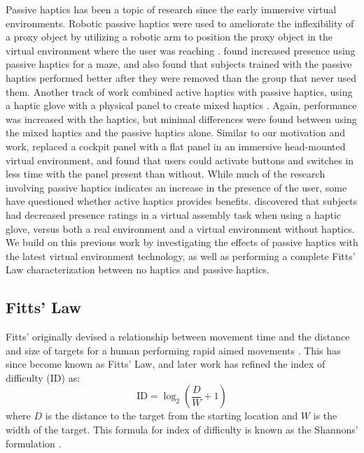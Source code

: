 Passive haptics has been a topic of research since the early immersive virtual environments.
Robotic passive haptics were used to ameliorate the inflexibility of a proxy object by utilizing a robotic arm to position the proxy object in the virtual environment where the user was reaching \citep{tachi_construction_1994,mcneely_robotic_1993}.
\citet{insko_passive_2001} found increased presence using passive haptics for a maze, and also found that subjects trained with the passive haptics performed better after they were removed than the group that never used them.
Another track of work combined active haptics with passive haptics, using a haptic glove with a physical panel to create mixed haptics \citep{borst_evaluation_2005}.
Again, performance was increased with the haptics, but minimal differences were found between using the mixed haptics and the passive haptics alone.
Similar to our motivation and work, \citet{schiefele_simple_1998} replaced a cockpit panel with a flat panel in an immersive head-mounted virtual environment, and found that users could activate buttons and switches in less time with the panel present than without.
While much of the research involving passive haptics indicates an increase in the presence of the user, some have questioned whether active haptics provides benefits.
\citet{pontonnier_designing_2014} discovered that subjects had decreased presence ratings in a virtual assembly task when using a haptic glove, versus both a real environment and a virtual environment without haptics.
We build on this previous work by investigating the effects of passive haptics with the latest virtual environment technology, as well as performing a complete Fitts' Law characterization between no haptics and passive haptics.

\subsection{Fitts' Law}

Fitts' originally devised a relationship between movement time and the distance and size of targets for a human performing rapid aimed movements \citep{fitts_information_1954}.
This has since become known as Fitts' Law, and later work has refined the index of difficulty ($\mathrm{ID}$) as:
\begin{equation}
    \mathrm{ID}=\log_2\left(\frac{D}{W}+1\right)
    \label{eq:index_of_difficulty}
\end{equation}
where $D$ is the distance to the target from the starting location and $W$ is the width of the target.
This formula for index of difficulty is known as the Shannons' formulation \citep{mackenzie_note_1989}.

